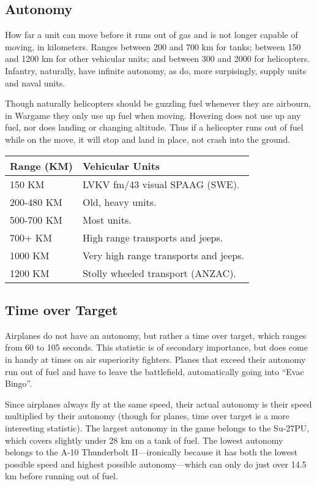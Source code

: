 \documentclass{article}
\begin{document}
\subsection{Autonomy}

How far a unit can move before it runs out of gas and is not longer capable of
moving, in kilometers. Ranges between 200 and 700 km for tanks; between 150 and
1200 km for other vehicular units; and between 300 and 2000 for helicopters.
Infantry, naturally, have infinite autonomy, as do, more surpisingly, supply
units and naval units.

Though naturally helicopters should be guzzling fuel whenever they are airbourn,
in Wargame they only use up fuel when moving. Hovering does not use up any fuel,
nor does landing or changing altitude. Thus if a helicopter runs out of fuel
while on the move, it will stop and land in place, not crash into the ground.

\begin{center}
    \begin{tabular}{ | l | p{9cm} | }
    \hline
    Range (KM) & Vehicular Units \\ \hline
    150 KM & LVKV fm/43 visual SPAAG (SWE). \\
    200-480 KM & Old, heavy units. \\
    500-700 KM & Most units. \\
    700+ KM & High range transports and jeeps. \\
    1000 KM & Very high range transports and jeeps. \\
    1200 KM & Stolly wheeled transport (ANZAC). \\
    \hline
    \end{tabular}
\end{center}

\subsection{Time over Target}

Airplanes do not have an autonomy, but rather a time over target, which ranges
from 60 to 105 seconds. This statistic is of secondary importance, but does come
in handy at times on air superiority fighters. Planes that exceed their autonomy
run out of fuel and have to leave the battlefield, automatically going into
``Evac Bingo''.

Since airplanes always fly at the same speed, their actual autonomy is their
speed multiplied by their autonomy (though for planes, time over target is a
more interesting statistic). The largest autonomy in the game belongs to the
Su-27PU, which covers slightly under 28 km on a tank of fuel.
The lowest autonomy belongs to the A-10 Thunderbolt II---ironically because it
has both the lowest possible speed and highest possible autonomy---which can
only do just over 14.5 km before running out of fuel.
\end{document}
